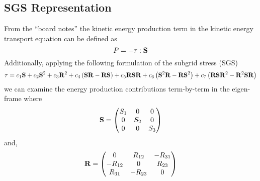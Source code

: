 \subsection{SGS Representation}
From the ``board notes'' the kinetic energy production term in the kinetic
energy transport equation can be defined as
\begin{equation}
    P =  - \mathbf{\tau}:\mathbf{S}
\end{equation}
Additionally, applying the following  formulation of the subgrid stress
(SGS) 
\begin{equation}
    \mathbf{\tau} = c_{1} \mathbf{S} + c_{2} \mathbf{S}^2 + c_{3} \mathbf{R}^2
                + c_{4} \left(\mathbf{S} \mathbf{R} - \mathbf{R} \mathbf{S} \right)
                + c_{5} \mathbf{R} \mathbf{S} \mathbf{R} 
                + c_{6} \left(\mathbf{S}^2 \mathbf{R} - \mathbf{R} \mathbf{S}^2 \right)
                + c_{7} \left( \mathbf{R} \mathbf{S} \mathbf{R}^2 - \mathbf{R}^2 \mathbf{S} \mathbf{R} \right) 
                \label{eq:SGS-tf-8}
\end{equation}
we can examine the energy production contributions term-by-term in the 
eigen-frame where
\begin{equation}
    \mathbf{S} =
    \begin{pmatrix}
        S_{1}      & 0         & 0         \\
        0           & S_{2}    & 0         \\
        0           & 0         & S_{3}    \\
    \end{pmatrix}
    \label{eq:Sij}
\end{equation}
and,
\begin{equation}
    \mathbf{R} =
    \begin{pmatrix}
        0           & R_{12}    & -R_{31}   \\
        -R_{12}     & 0         & R_{23}    \\
        R_{31}      & -R_{23}   & 0         \\
    \end{pmatrix}
\end{equation}









